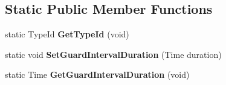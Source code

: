\subsection*{\-Static \-Public \-Member \-Functions}
\begin{DoxyCompactItemize}
\item 
\hypertarget{classns3_1_1PLC__HalfDuplexOfdmPhy_a3e1f887ac54a21f1b25dc9ae0d400876}{static \-Type\-Id {\bfseries \-Get\-Type\-Id} (void)}\label{classns3_1_1PLC__HalfDuplexOfdmPhy_a3e1f887ac54a21f1b25dc9ae0d400876}

\item 
\hypertarget{classns3_1_1PLC__HalfDuplexOfdmPhy_a2f8829a35fa830a115bcb1745b6ff78e}{static void {\bfseries \-Set\-Guard\-Interval\-Duration} (\-Time duration)}\label{classns3_1_1PLC__HalfDuplexOfdmPhy_a2f8829a35fa830a115bcb1745b6ff78e}

\item 
\hypertarget{classns3_1_1PLC__HalfDuplexOfdmPhy_acadeeeb6cfd55ccb8a58d1b6f169f7aa}{static \-Time {\bfseries \-Get\-Guard\-Interval\-Duration} (void)}\label{classns3_1_1PLC__HalfDuplexOfdmPhy_acadeeeb6cfd55ccb8a58d1b6f169f7aa}

\end{DoxyCompactItemize}
